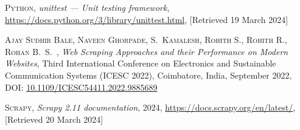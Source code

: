 \documentclass{thesis-ekf}
\theoremstyle{definition}
\theoremstyle{remark}
\begin{document}
\begin{thebibliography}{2}
\textsc{Python},
\emph{unittest — Unit testing framework},
\url{https://docs.python.org/3/library/unittest.html}, [Retrieved 19 March 2024]

\textsc{Ajay Sudhir Bale, Naveen Ghorpade, S.~Kamalesh, Rohith S., Rohith R., Rohan B.~S.~},
\emph{Web Scraping Approaches and their Performance on Modern Websites},
Third International Conference on Electronics and Sustainable Communication Systems (ICESC 2022),
Coimbatore, India, September 2022,
DOI: \href{https://doi.org/10.1109/ICESC54411.2022.9885689}{10.1109/ICESC54411.2022.9885689}

\textsc{Scrapy},
\emph{Scrapy 2.11 documentation}, 2024, 
\url{https://docs.scrapy.org/en/latest/}, [Retrieved 20 March 2024]

\end{thebibliography}




\end{document}
